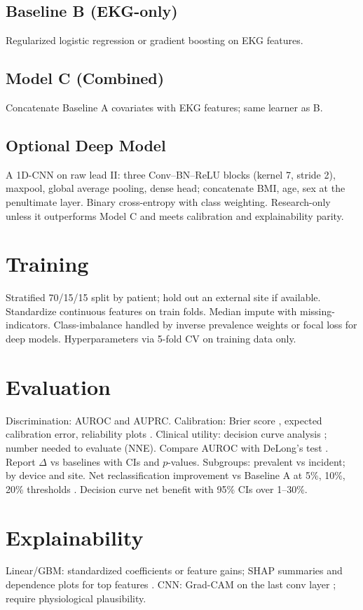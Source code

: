 \documentclass[11pt]{article}
\begin{document}
\subsection{Baseline B (EKG-only)}
Regularized logistic regression or gradient boosting on EKG features.
\subsection{Model C (Combined)}
Concatenate Baseline A covariates with EKG features; same learner as B.
\subsection{Optional Deep Model}
A 1D-CNN on raw lead II: three Conv--BN--ReLU blocks (kernel 7, stride 2), maxpool, global average pooling, dense head; concatenate BMI, age, sex at the penultimate layer. Binary cross-entropy with class weighting. Research-only unless it outperforms Model C and meets calibration and explainability parity.

\section{Training}
Stratified 70/15/15 split by patient; hold out an external site if available. Standardize continuous features on train folds. Median impute with missing-indicators. Class-imbalance handled by inverse prevalence weights or focal loss for deep models. Hyperparameters via 5-fold CV on training data only.

\section{Evaluation}
Discrimination: AUROC and AUPRC. Calibration: Brier score \citep{brier1950}, expected calibration error, reliability plots \citep{steyerberg2019clinical}. Clinical utility: decision curve analysis \citep{vickers2006dca}; number needed to evaluate (NNE). Compare AUROC with DeLong's test \citep{delong1988}. Report $\Delta$ vs baselines with CIs and $p$-values. Subgroups: prevalent vs incident; by device and site. Net reclassification improvement vs Baseline A at 5\%, 10\%, 20\% thresholds \citep{pencina2008nri}. Decision curve net benefit with 95\% CIs over 1--30\%.

\section{Explainability}
Linear/GBM: standardized coefficients or feature gains; SHAP summaries and dependence plots for top features \citep{lundberg2017shap}. CNN: Grad-CAM on the last conv layer \citep{selvaraju2017gradcam}; require physiological plausibility.
\end{document}
